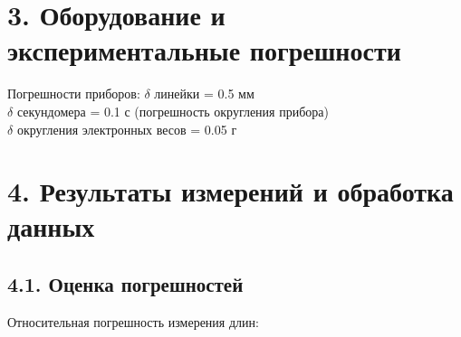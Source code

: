 \section*{3. Оборудование и экспериментальные погрешности}

    Погрешности приборов: $\delta $ линейки = 0.5 мм\\
    $\delta $ секундомера = 0.1 с (погрешность округления прибора)\\
    $\delta $ округления электронных весов = 0.05 г\\


\section*{4. Результаты измерений и обработка данных}

\subsection*{4.1. Оценка погрешностей}

    Относительная погрешность измерения длин:
    
